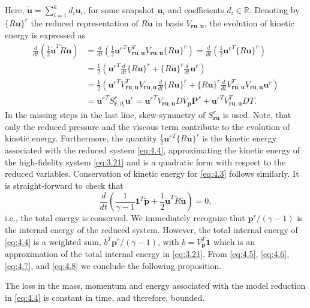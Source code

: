 Here, $\tilde{\mathbf u} = \sum_{i=1}^k d_i \mathbf u_i$, for some snapshot $\mathbf u_i$ and coefficients $d_i \in \mathbb R$. Denoting by $\{ R \mathbf u\}^r$ the reduced representation of $R\mathbf u$ in basis $V_{\mathbf r \mathbf u , \mathbf u}$, the evolution of kinetic energy is expressed as
\begin{equation} \label{eq:4.7}
	\begin{aligned}
	\frac{d}{dt}\left( \frac 1 2 \tilde{\mathbf u}^T \tilde{ R } \tilde {\mathbf u} \right) &= \frac{d}{dt}\left( \frac 1 2 {\mathbf u^r}^T V_{\mathbf r \mathbf u , \mathbf u}^T V_{\mathbf r \mathbf u , \mathbf u} \{ R \mathbf u\}^r \right) = \frac{d}{dt}\left( \frac 1 2 {\mathbf u^r}^T \{ R \mathbf u\}^r \right) \\
	&= \frac 1 2 \left( {\mathbf u^r}^T \frac{d}{dt} \{ R \mathbf u \}^r + \{ R \mathbf u \}^r \frac{d}{dt} \mathbf u^r \right) \\
	&= \frac 1 2 \left( {\mathbf u^r}^T V_{\mathbf r \mathbf u , \mathbf u}^T V_{\mathbf r \mathbf u , \mathbf u} \frac{d}{dt} \{ R \mathbf u \}^r + \{ R \mathbf u \}^r \frac{d}{dt} V_{\mathbf r \mathbf u , \mathbf u}^T V_{\mathbf r \mathbf u , \mathbf u} \mathbf u^r \right) \\
	&= {\mathbf u^r}^T S^r_{\mathbf r, \partial_t} \mathbf u^r = { \mathbf u^r }^T V_{\mathbf r \mathbf u , \mathbf u} D V_{\mathbf p} \mathbf P^r + { \mathbf u^r }^T V_{\mathbf r \mathbf u , \mathbf u}^T D T.
	\end{aligned}
\end{equation}
In the missing steps in the last line, skew-symmetry of $S_{\mathbf r \mathbf u}^r$ is used. Note, that only the reduced pressure and the viscous term contribute to the evolution of kinetic energy. Furthermore, the quantity $ \frac 1 2 {\mathbf u^r}^T \{ R \mathbf u\}^r$ is the kinetic energy associated with the reduced system \eqref{eq:4.4}, approximating the kinetic energy of the high-fidelity system \eqref{eq:3.21} and is a quadratic form with respect to the reduced variables. Conservation of kinetic energy for \eqref{eq:4.3} follows similarly. It is  straight-forward to check that
\begin{equation} \label{eq:4.8}
	\frac{d}{dt} \left( \frac{1}{\gamma - 1} \mathbf 1^T \tilde{\mathbf p} + \frac{1}{2} \tilde{\mathbf u}^T \tilde R \tilde{\mathbf u} \right) = 0,
\end{equation}
i.e., the total energy is conserved. We immediately recognize that $ \mathbf p^r /(\gamma - 1)$ is the internal energy of the reduced system. However, the total internal energy of \eqref{eq:4.4} is a weighted sum, $ b^T\mathbf p^r /(\gamma - 1)$, with $b = V_{\mathbf p}^T \mathbf 1$ which is an approximation of the total internal energy in \eqref{eq:3.21}. From \eqref{eq:4.5}, \eqref{eq:4.6}, \eqref{eq:4.7}, and \eqref{eq:4.8} we conclude the following proposition.
\begin{proposition}
	The loss in the mass, momentum and energy associated with the model reduction in \eqref{eq:4.4} is constant in time, and therefore, bounded.
\end{proposition}

